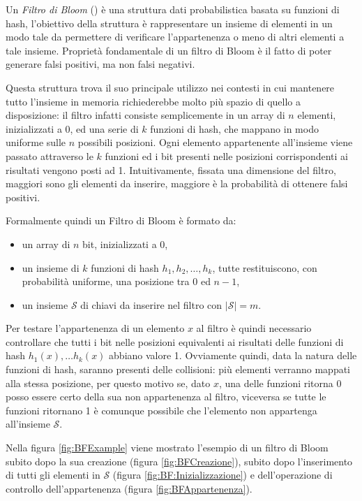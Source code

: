 \documentclass[../../main.tex]{subfiles}
\begin{document}
Un \textit{Filtro di Bloom} (\cite{Bloom1970SpacetimeTI}) è una struttura dati probabilistica basata su funzioni di hash, l'obiettivo della struttura è rappresentare un insieme di elementi in un modo tale da permettere di verificare l'appartenenza o meno di altri elementi a tale insieme. Proprietà fondamentale di un filtro di Bloom è il fatto di poter generare falsi positivi, ma non falsi negativi.

Questa struttura trova il suo principale utilizzo nei contesti in cui mantenere tutto l'insieme in memoria richiederebbe molto più spazio di quello a disposizione: il filtro infatti consiste semplicemente in un array di $n$ elementi, inizializzati a $0$, ed una serie di $k$ funzioni di hash, che mappano in modo uniforme sulle $n$ possibili posizioni. Ogni elemento appartenente all'insieme viene passato attraverso le $k$ funzioni ed i bit presenti nelle posizioni corrispondenti ai risultati vengono posti ad 1. Intuitivamente, fissata una dimensione del filtro, maggiori sono gli elementi da inserire, maggiore è la probabilità di ottenere falsi positivi.

Formalmente quindi un Filtro di Bloom è formato da:
    \begin{itemize}
        \item un array di $n$ bit, inizializzati a 0,
        \item un insieme di $k$ funzioni di hash $h_1, h_2, \dots, h_k$, tutte restituiscono, con probabilità uniforme, una posizione tra $0$ ed $n-1$,
        \item un insieme $\mathcal{S}$ di chiavi da inserire nel filtro con $|\mathcal{S}| = m$.
    \end{itemize}
Per testare l'appartenenza di un elemento $x$ al filtro è quindi necessario controllare che tutti i bit nelle posizioni equivalenti ai risultati delle funzioni di hash $h_1(x), \dots h_k(x)$ abbiano valore 1. Ovviamente quindi, data la natura delle funzioni di hash, saranno presenti delle collisioni: più elementi verranno mappati alla stessa posizione, per questo motivo se, dato $x$, una delle funzioni ritorna 0 posso essere certo della sua non appartenenza al filtro, viceversa se tutte le funzioni ritornano 1 è comunque possibile che l'elemento non appartenga all'insieme $\mathcal{S}$.

Nella figura \ref{fig:BFExample} viene mostrato l'esempio di un filtro di Bloom subito dopo la sua creazione (figura \ref{fig:BFCreazione}), subito dopo l'inserimento di tutti gli elementi in $\mathcal{S}$ (figura \ref{fig:BF:Inizializzazione}) e dell'operazione di controllo dell'appartenenza (figura \ref{fig:BFAppartenenza}).
\end{document}
